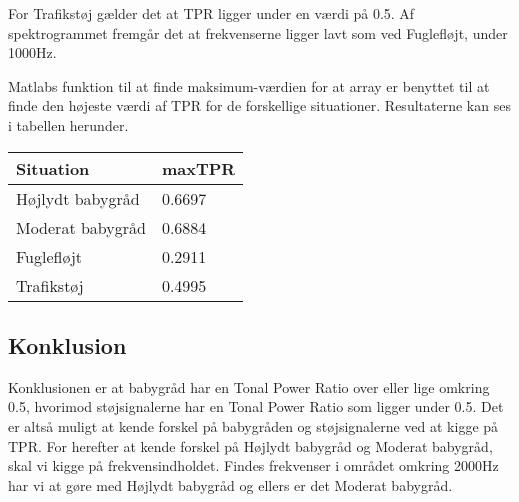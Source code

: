 For Trafikstøj gælder det at TPR ligger under en værdi på 0.5. Af spektrogrammet fremgår det at frekvenserne ligger lavt som ved Fuglefløjt, under 1000Hz. 


Matlabs funktion til at finde maksimum-værdien for at array er benyttet til at finde den højeste værdi af TPR for de forskellige situationer. Resultaterne kan ses i tabellen herunder. 

\begin{center}
    \begin{tabular}{ | l | l |}
    \hline
    \textbf{Situation} & \textbf{maxTPR}  \\ \hline
    Højlydt babygråd & 0.6697   \\ \hline
    Moderat babygråd & 0.6884  \\ \hline
    Fuglefløjt & 0.2911  \\ \hline
    Trafikstøj & 0.4995  \\
    \hline
    \end{tabular}
\end{center}

\subsection{Konklusion}
Konklusionen er at babygråd har en Tonal Power Ratio over eller lige omkring 0.5, hvorimod støjsignalerne har en Tonal Power Ratio som ligger under 0.5. Det er altså muligt at kende forskel på babygråden og støjsignalerne ved at kigge på TPR. For herefter at kende forskel på Højlydt babygråd og Moderat babygråd, skal vi kigge på frekvensindholdet. Findes frekvenser i området omkring 2000Hz har vi at gøre med Højlydt babygråd og ellers er det Moderat babygråd. 